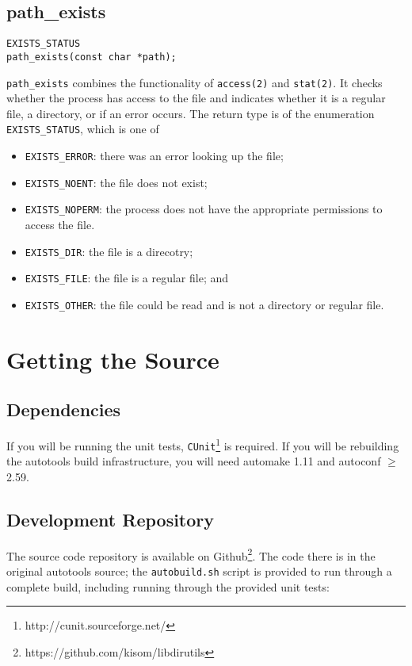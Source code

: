 \documentclass[10pt,letterpaper]{article}
\begin{document}
\subsection*{path\_exists}
\begin{verbatim}
EXISTS_STATUS
path_exists(const char *path);
\end{verbatim}
\verb|path_exists| combines the functionality of \verb|access(2)| and
\verb|stat(2)|. It checks whether the process has access to the file
and indicates whether it is a regular file, a directory, or if an
error occurs. The return type is of the enumeration \verb|EXISTS_STATUS|,
which is one of
\\
\begin{itemize}
  \item \verb|EXISTS_ERROR|: there was an error looking up the file;
  \item \verb|EXISTS_NOENT|: the file does not exist;
  \item \verb|EXISTS_NOPERM|: the process does not have the appropriate
  permissions to access the file.
  \item \verb|EXISTS_DIR|: the file is a direcotry;
  \item \verb|EXISTS_FILE|: the file is a regular file; and
  \item \verb|EXISTS_OTHER|: the file could be read and is not a directory
or regular file.

\end{itemize}

\section*{Getting the Source}
\subsection*{Dependencies}
If you will be running the unit tests, \verb|CUnit|\footnote{http://cunit.sourceforge.net/}
is required. If you will be rebuilding the autotools build infrastructure,
you will need automake 1.11 and autoconf $\geq$ 2.59.
\subsection*{Development Repository}
The source code repository is available on Github\footnote{https://github.com/kisom/libdirutils}.
The code there is in the original autotools source; the \verb|autobuild.sh|
script is provided to run through a complete build, including running through
the provided unit tests:
\end{document}
